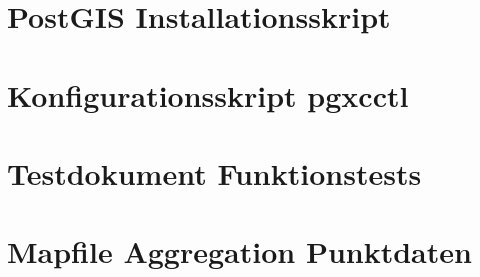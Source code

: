 \section{PostGIS Installationsskript}

\section{Konfigurationsskript pgxcctl}

\section{Testdokument Funktionstests}

\section{Mapfile Aggregation Punktdaten}

												

\pagestyle{empty}


